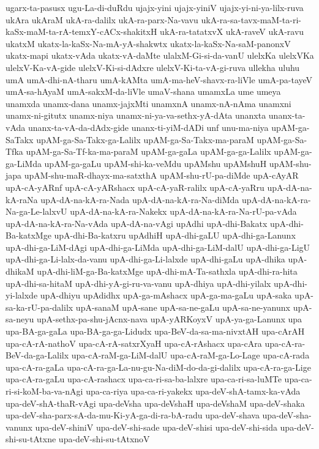 {ugarx-ta-pasusx
ugu-La-di-duRdu
ujajx-yini
ujajx-yiniV
ujajx-yi-ni-ya-lilx-ruva
ukAra
ukAraM
ukA-ra-dalilx
ukA-ra-parx-Na-vavu
ukA-ra-sa-tavx-maM-ta-ri-kaSx-maM-ta-rA-temxY-cACx-shakitxH
ukA-ra-tatatxvX
ukA-raveV
ukA-ravu
ukatxM
ukatx-la-kaSx-Na-mA-yA-shakwtx
ukatx-la-kaSx-Na-saM-panonxV
ukatx-mapi
ukatx-vAda
ukatx-vA-daMte
ulalxM-Gi-si-da-vanU
ulelxKa
ulelxVKa
ulelxV-Ka-vA-gide
ulelxV-Ki-si-dAdxre
ulelxV-Ki-ta-vA-gi-ruva
ullekha
uluhu
umA
umA-dhi-nA-tharu
umA-kAMta
umA-ma-heV-shavx-ra-liVle
umA-pa-tayeV
umA-sa-hAyaM
umA-sakxM-da-liVle
umaV-shana
umamxLa
ume
umeya
unamxda
unamx-dana
unamx-jajxMti
unamxnA
unamx-nA-nAma
unamxni
unamx-ni-gitutx
unamx-niya
unamx-ni-ya-va-sethx-yA-dAta
unanxta
unanx-ta-vAda
unanx-ta-vA-da-dAdx-gide
unanx-ti-yiM-dADi
unf
unu-ma-niya
upAM-ga-SaTakx
upAM-ga-Sa-Takx-ga-Lalilx
upAM-ga-Sa-Takx-ma-paraM
upAM-ga-Sa-Tfka
upAM-ga-Sa-Tf-ka-ma-paraM
upAM-ga-gaLa
upAM-ga-ga-Lalilx
upAM-ga-ga-LiMda
upAM-ga-gaLu
upAM-shi-ka-veMdu
upAMshu
upAMshuH
upAM-shu-japa
upAM-shu-maR-dhayx-ma-satxthA
upAM-shu-rU-pa-diMde
upA-cAyAR
upA-cA-yARnf
upA-cA-yARshacx
upA-cA-yaR-ralilx
upA-cA-yaRru
upA-dA-na-kA-raNa
upA-dA-na-kA-ra-Nada
upA-dA-na-kA-ra-Na-diMda
upA-dA-na-kA-ra-Na-ga-Le-lalxvU
upA-dA-na-kA-ra-Nakekx
upA-dA-na-kA-ra-Na-rU-pa-vAda
upA-dA-na-kA-ra-Na-vAda
upA-dA-na-vAgi
upAdhi
upA-dhi-Bakatx
upA-dhi-Ba-katxMge
upA-dhi-Ba-katxru
upAdhiH
upA-dhi-gaLU
upA-dhi-ga-Lanunx
upA-dhi-ga-LiM-dAgi
upA-dhi-ga-LiMda
upA-dhi-ga-LiM-dalU
upA-dhi-ga-LigU
upA-dhi-ga-Li-lalx-da-vanu
upA-dhi-ga-Li-lalxde
upA-dhi-gaLu
upA-dhika
upA-dhikaM
upA-dhi-liM-ga-Ba-katxMge
upA-dhi-mA-Ta-sathxla
upA-dhi-ra-hita
upA-dhi-sa-hitaM
upA-dhi-yA-gi-ru-va-vanu
upA-dhiya
upA-dhi-yilalx
upA-dhi-yi-lalxde
upA-dhiyu
upAdidhx
upA-ga-mAshacx
upA-ga-ma-gaLu
upA-saka
upA-sa-ka-rU-pa-dalilx
upA-sanaM
upA-sane
upA-sa-ne-gaLu
upA-sa-ne-yanunx
upA-sa-neyu
upA-sethx-pa-shu-jAcnx-nava
upA-yARKoyxV
upA-ya-ga-Lanunx
upa
upa-BA-ga-gaLa
upa-BA-ga-ga-Lidudx
upa-BeV-da-sa-ma-nivxtAH
upa-cArAH
upa-cA-rA-nathoV
upa-cA-rA-satxrXyaH
upa-cA-rAshacx
upa-cAra
upa-cA-ra-BeV-da-ga-Lalilx
upa-cA-raM-ga-LiM-dalU
upa-cA-raM-ga-Lo-Lage
upa-cA-rada
upa-cA-ra-gaLa
upa-cA-ra-ga-La-nu-gu-Na-diM-do-da-gi-dalilx
upa-cA-ra-ga-Lige
upa-cA-ra-gaLu
upa-cA-rashacx
upa-ca-ri-sa-ba-lalxre
upa-ca-ri-sa-luMTe
upa-ca-ri-si-koM-ba-va-nAgi
upa-ca-riya
upa-ca-ri-yakekx
upa-deV-shA-tamx-ka-vAda
upa-deV-shA-thaR-vAgi
upa-deVsha
upa-deVshaH
upa-deVshaM
upa-deV-shaka
upa-deV-sha-parx-sA-da-mu-Ki-yA-ga-di-ra-bA-radu
upa-deV-shava
upa-deV-sha-vanunx
upa-deV-shiniV
upa-deV-shi-sade
upa-deV-shisi
upa-deV-shi-sida
upa-deV-shi-su-tAtxne
upa-deV-shi-su-tAtxnoV
}
